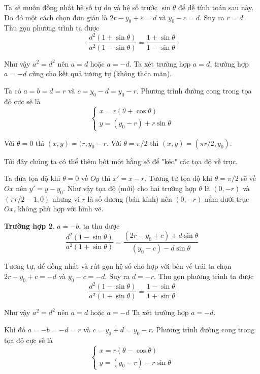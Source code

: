 \documentclass{mynotes}
\theoremstyle{definition}
\begin{document}
Ta sẽ muốn đồng nhất hệ số tự do và hệ số trước $\sin \theta$ để dễ tính toán sau này. Do đó một cách chọn đơn giản là $2 r - y_0 + c = d$ và $y_0 - c = d$. Suy ra $r = d$. Thu gọn phương trình ta được
\begin{equation*}
    \frac{d^2 (1 + \sin \theta)}{a^2 (1 - \sin \theta)} = \frac{1 + \sin \theta}{1 - \sin \theta}
\end{equation*}

Như vậy $a^2 = d^2$ nên $a = d$ hoặc $a = -d$. Ta xét trường hợp $a = d$, trường hợp $a = -d$ cũng cho kết quả tương tự (không thỏa mãn). 

Ta có  $a = b = d = r$ và $c = y_0 - d = y_0 - r$. Phương trình đường cong trong tọa độ cực sẽ là
\begin{equation*}
    \begin{cases}
        x = r(\theta + \cos \theta) \\ y = (y_0 - r) + r \sin \theta
    \end{cases}
\end{equation*}

Với $\theta = 0$ thì $(x, y) = (r, y_0 - r$. Với $\theta = \pi / 2$ thì $(x, y) = (\pi r / 2, y_0)$.

Tới đây chúng ta có thể thêm bớt một hằng số để "kéo" các tọa độ về trục. 

Ta đưa tọa độ khi $\theta = 0$ về $Oy$ thì $x' = x - r$. Tương tự tọa độ khi $\theta = \pi / 2$ sẽ về $Ox$ nên $y' = y - y_0$. Như vậy tọa độ (mới) cho hai trường hợp $\theta$ là $(0, -r)$ và $(\pi r / 2 - 1, 0)$ nhưng vì $r$ là số dương (bán kính) nên $(0, -r)$ nằm dưới trục $Ox$, không phù hợp với hình vẽ.

\textbf{Trường hợp 2}. $a = -b$, ta thu được
\begin{equation*}
    \frac{d^2 (1 - \sin\theta)}{a^2 (1 + \sin\theta)} = \frac{(2r - y_0 + c) + d \sin\theta}{(y_0 - c) - d \sin\theta}
\end{equation*}

Tương tự, để đồng nhất và rút gọn hệ số cho hợp với bên vế trái ta chọn $2r - y_0 + c = -d$ và $y_0 - c = -d$. Suy ra $d = -r$. Thu gọn phương trình ta được
\begin{equation*}
    \frac{d^2 (1 - \sin\theta)}{a^2 (1 + \sin\theta)} = \frac{1 - \sin\theta}{1 + \sin\theta}
\end{equation*}

Như vậy $a^2 = d^2$ nên $a = d$ hoặc $a = -d$ Ta xét trường hợp $a = -d$.

Khi đó $a = -b = -d = r$ và $c = y_0 + d = y_0 - r$. Phương trình đường cong trong tọa độ cực sẽ là 
\begin{equation*}
    \begin{cases}
        x = r (\theta - \cos\theta) \\
        y = (y_0 - r) - r \sin\theta
    \end{cases}
\end{equation*}
\end{document}
